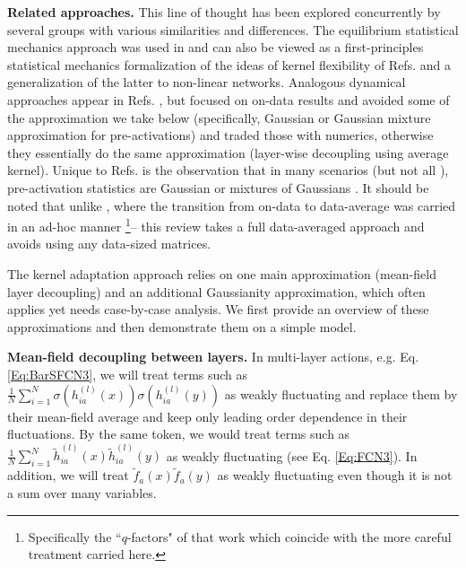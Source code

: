 {\bf Related approaches.} This line of thought has been explored concurrently by several groups with various similarities and differences. The equilibrium statistical mechanics approach was used in \citep{naveh2021self,seroussi2023separation} and can also be viewed as a first-principles statistical mechanics formalization of the ideas of kernel flexibility of Refs. \cite{aitchison2019bigger,aitchison2021deepProcess} and a generalization of the latter to non-linear networks. Analogous dynamical approaches appear in Refs. \citep{yang2022tensorprogramsvtuning,bordelon2022self}, but focused on on-data results and avoided some of the approximation we take below (specifically, Gaussian or Gaussian mixture approximation for pre-activations) and traded those with numerics, otherwise they essentially do the same approximation (layer-wise decoupling using average kernel). Unique to Refs. \citep{naveh2021self,seroussi2023separation} is the observation that in many scenarios (but not all \citep{seroussi2023separation,rubin2024grokking}), pre-activation statistics are Gaussian or mixtures of Gaussians \cite{rubin2024grokking}. It should be noted that unlike \citep{seroussi2023separation}, where the transition from on-data to data-average was carried in an ad-hoc manner \footnote{Specifically the ``$q$-factors" of that work which coincide with the more careful treatment carried here.}-- this review takes a full data-averaged approach and avoids using any data-sized matrices.  

The kernel adaptation approach relies on one main approximation (mean-field layer decoupling) and an additional Gaussianity approximation, which often applies yet needs case-by-case analysis. We first provide an overview of these approximations and then demonstrate them on a simple model. 

{\bf Mean-field decoupling between layers.} In multi-layer actions, e.g. Eq. \eqref{Eq:BarSFCN3}, we will treat terms such as $\frac{1}{N}\sum_{i=1}^N \sigma(h_{ia}^{(l)}(x))\sigma(h_{ia}^{(l)}(y))$ as weakly fluctuating and replace them by their mean-field average and keep only leading order dependence in their fluctuations. By the same token, we would treat terms such as $\frac{1}{N}\sum_{i=1}^N\tilde{h}^{(l)}_{ia}(x)\tilde{h}^{(l)}_{ia}(y)$ as weakly fluctuating (see Eq. \ref{Eq:FCN3}). In addition, we will treat $\tilde{f}_a(x) \tilde{f}_a(y)$ as weakly fluctuating even though it is not a sum over many variables. 

